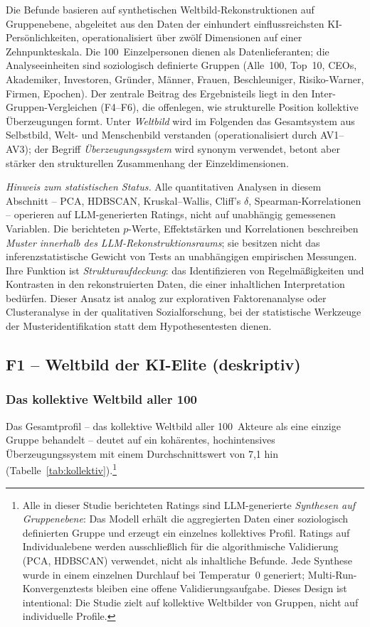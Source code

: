 \documentclass[12pt,a4paper]{article}
\begin{document}
Die Befunde basieren auf synthetischen Weltbild-Rekonstruktionen auf Gruppenebene, abgeleitet aus den Daten der einhundert einflussreichsten KI-Persönlichkeiten, operationalisiert über zwölf Dimensionen auf einer Zehnpunkteskala. Die 100~Einzelpersonen dienen als Datenlieferanten; die Analyseeinheiten sind soziologisch definierte Gruppen (Alle~100, Top~10, CEOs, Akademiker, Investoren, Gründer, Männer, Frauen, Beschleuniger, Risiko-Warner, Firmen, Epochen). Der zentrale Beitrag des Ergebnisteils liegt in den Inter-Gruppen-Vergleichen (F4--F6), die offenlegen, wie strukturelle Position kollektive Überzeugungen formt. Unter \emph{Weltbild} wird im Folgenden das Gesamtsystem aus Selbstbild, Welt- und Menschenbild verstanden (operationalisiert durch AV1--AV3); der Begriff \emph{Überzeugungssystem} wird synonym verwendet, betont aber stärker den strukturellen Zusammenhang der Einzeldimensionen.

\emph{Hinweis zum statistischen Status.} Alle quantitativen Analysen in diesem Abschnitt -- PCA, HDBSCAN, Kruskal--Wallis, Cliff's $\delta$, Spearman-Korrelationen -- operieren auf LLM-generierten Ratings, nicht auf unabhängig gemessenen Variablen. Die berichteten $p$-Werte, Effektstärken und Korrelationen beschreiben \emph{Muster innerhalb des LLM-Rekonstruktionsraums}; sie besitzen nicht das inferenzstatistische Gewicht von Tests an unabhängigen empirischen Messungen. Ihre Funktion ist \emph{Strukturaufdeckung}: das Identifizieren von Regelmäßigkeiten und Kontrasten in den rekonstruierten Daten, die einer inhaltlichen Interpretation bedürfen. Dieser Ansatz ist analog zur explorativen Faktorenanalyse oder Clusteranalyse in der qualitativen Sozialforschung, bei der statistische Werkzeuge der Musteridentifikation statt dem Hypothesentesten dienen.


\subsection{F1 -- Weltbild der KI-Elite (deskriptiv)}
\label{sec:ergebnisse:f1}

\subsubsection{Das kollektive Weltbild aller 100}

Das Gesamtprofil -- das kollektive Weltbild aller 100~Akteure als eine einzige Gruppe behandelt -- deutet auf ein kohärentes, hochintensives Überzeugungssystem mit einem Durchschnittswert von 7,1 hin (Tabelle~\ref{tab:kollektiv}).\footnote{Alle in dieser Studie berichteten Ratings sind LLM-generierte \emph{Synthesen auf Gruppenebene}: Das Modell erhält die aggregierten Daten einer soziologisch definierten Gruppe und erzeugt ein einzelnes kollektives Profil. Ratings auf Individualebene werden ausschließlich für die algorithmische Validierung (PCA, HDBSCAN) verwendet, nicht als inhaltliche Befunde. Jede Synthese wurde in einem einzelnen Durchlauf bei Temperatur~0 generiert; Multi-Run-Konvergenztests bleiben eine offene Validierungsaufgabe. Dieses Design ist intentional: Die Studie zielt auf kollektive Weltbilder von Gruppen, nicht auf individuelle Profile.}
\end{document}
